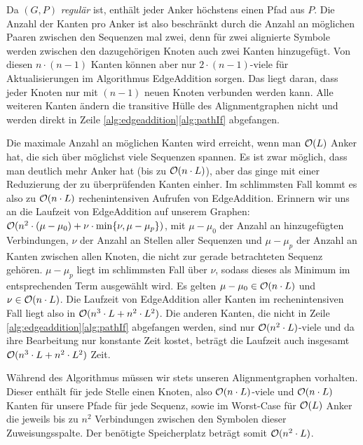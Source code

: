 \begin{beweis}
	Da $(G,P)$ \emph{regulär} ist, enthält jeder Anker höchstens einen Pfad aus $P$. Die Anzahl der Kanten pro Anker ist also beschränkt durch die Anzahl an möglichen Paaren zwischen den Sequenzen mal zwei, denn für zwei alignierte Symbole werden zwischen den dazugehörigen Knoten auch zwei Kanten hinzugefügt. Von diesen $n\cdot (n-1)$ Kanten können aber nur $2\cdot (n-1)$-viele für Aktualisierungen im Algorithmus \textrm{EdgeAddition} sorgen. Das liegt daran, dass jeder Knoten nur mit $(n-1)$ neuen Knoten verbunden werden kann. Alle weiteren Kanten ändern die transitive Hülle des Alignmentgraphen nicht und werden direkt in Zeile \ref{alg:edgeaddition}\ref{alg:pathIf} abgefangen.
	
	Die maximale Anzahl an möglichen Kanten wird erreicht, wenn man $\mathcal{O}(L)$ Anker hat, die sich über möglichst viele Sequenzen spannen. Es ist zwar möglich, dass man deutlich mehr Anker hat (bis zu $\mathcal{O}(n\cdot L)$), aber das ginge mit einer Reduzierung der zu überprüfenden Kanten einher. Im schlimmsten Fall kommt es also zu $\mathcal{O}(n\cdot L)$ rechenintensiven Aufrufen von \textrm{EdgeAddition}. Erinnern wir uns an die Laufzeit von \textrm{EdgeAddition} auf unserem Graphen: $\mathcal{O}(n^2 \cdot (\mu - \mu_0) + \nu \cdot \min\{\nu, \mu - \mu_p\})$, mit $\mu - \mu_0$ der Anzahl an hinzugefügten Verbindungen, $\nu$ der Anzahl an Stellen aller Sequenzen und $\mu - \mu_p$ der Anzahl an Kanten zwischen allen Knoten, die nicht zur gerade betrachteten Sequenz gehören. $\mu - \mu_p$ liegt im schlimmsten Fall über $\nu$, sodass dieses als Minimum im entsprechenden Term ausgewählt wird. Es gelten $\mu - \mu_0 \in \mathcal{O}(n\cdot L)$ und $\nu \in \mathcal{O}(n\cdot L)$. Die Laufzeit von \textrm{EdgeAddition} aller Kanten im rechenintensiven Fall liegt also in $\mathcal{O}(n^3\cdot L + n^2\cdot L^2)$. Die anderen Kanten, die nicht in Zeile \ref{alg:edgeaddition}\ref{alg:pathIf} abgefangen werden, sind nur $\mathcal{O}(n^2\cdot L)$-viele und da ihre Bearbeitung nur konstante Zeit kostet, beträgt die Laufzeit auch insgesamt $\mathcal{O}(n^3\cdot L + n^2\cdot L^2)$ Zeit.
	
	Während des Algorithmus müssen wir stets unseren Alignmentgraphen vorhalten. Dieser enthält für jede Stelle einen Knoten, also $\mathcal{O}(n\cdot L)$-viele und $\mathcal{O}(n\cdot L)$ Kanten für unsere Pfade für jede Sequenz, sowie im Worst-Case für $\mathcal{O}(L)$ Anker die jeweils bis zu $n^2$ Verbindungen zwischen den Symbolen dieser Zuweisungsspalte. Der benötigte Speicherplatz beträgt somit $\mathcal{O}(n^2\cdot L)$.  
\end{beweis}

